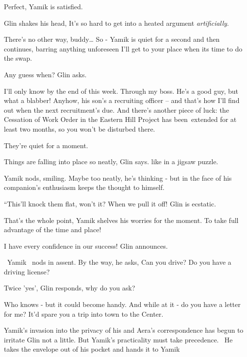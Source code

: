 \documentclass[letterpaper]{article}
\begin{document}
{\textquotedbl}Perfect,{\textquotedbl} Yamik is satisfied. 

Glin shakes his head, {\textquotedbl}It's so hard to get into a heated argument \textit{artificially}.{\textquotedbl} 

{\textquotedbl}There's no other way, buddy{\dots} So -{\textquotedbl} Yamik is quiet for a second and then continues,
{\textquotedbl}barring anything unforeseen I'll get to your place when its time to do the swap.{\textquotedbl} 

{\textquotedbl}Any guess when?{\textquotedbl} Glin asks. 

{\textquotedbl}I'll only know by the end of this week. Through my boss. He's a good guy, but what a blabber! Anyhow, his
son's a recruiting officer -- and that's how I'll find out when the next recruitment's due. And there's another piece
of luck: the Cessation of Work Order in the Eastern Hill Project has been~extended for at least two months, so you
won't be disturbed there.{\textquotedbl}

They're quiet for a moment.

{\textquotedbl}Things are falling into place so neatly,{\textquotedbl} Glin says. {\textquotedbl}like in a jigsaw
puzzle.{\textquotedbl}

Yamik nods, smiling. Maybe too neatly, he's thinking - but in the face of his companion's enthusiasm keeps the thought
to himself. 

{}``This'll knock them flat, won't it? When we pull it off!{\textquotedbl} Glin is ecstatic. 

{\textquotedbl}That's the whole point,{\textquotedbl} Yamik shelves his worries for the moment. {\textquotedbl}To take
full advantage of the time and place!{\textquotedbl}

{\textquotedbl}I have every confidence in our success!{\textquotedbl} Glin announces.

~Yamik \ nods in assent. {\textquotedbl}By the way,{\textquotedbl} he asks, {\textquotedbl}Can you drive? Do you have a
driving license{\textquotedbl}?

{\textquotedbl}Twice 'yes',{\textquotedbl} Glin responds, {\textquotedbl}why do you ask?{\textquotedbl}

{\textquotedbl}Who knows - but it could become handy. And while at it - do you have a letter for me? It'd spare you a
trip into town to the Center.{\textquotedbl}

Yamik's invasion into the privacy of his and Aera's correspondence has begun to irritate Glin not a little. But Yamik's
practicality must take precedence. \ He takes the envelope out of his pocket and hands it to Yamik ~ 
\end{document}
